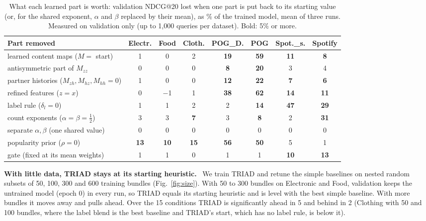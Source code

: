 \documentclass[runningheads]{llncs}
\renewcommand{\paragraph}[1]{\smallskip\noindent\textbf{#1}\ }
\begin{document}
\begin{table}[!htb]
\centering
\caption{What each learned part is worth: validation NDCG@20 lost when one part is put back to its starting value
(or, for the shared exponent, $\alpha$ and $\beta$ replaced by their mean), as \% of the trained model, mean of three
runs. Measured on validation only (up to 1,000 queries per dataset). Bold: 5\% or more.}
\label{tab:knock}
\setlength{\tabcolsep}{2.2pt}
\scriptsize
\begin{tabular}{lccccccc}
\toprule
Part removed & Electr. & Food & Cloth. & POG\_D. & POG & Spot.\_s. & Spotify\\
\midrule
learned content maps ($M=$ start) & 1 & 0 & 2 & \textbf{19} & \textbf{59} & \textbf{11} & \textbf{8}\\
\quad antisymmetric part of $M_{zz}$ & 0 & 0 & 0 & \textbf{8} & \textbf{20} & 3 & 4\\
\quad partner histories ($M_{zh},M_{hz},M_{hh}=0$) & 1 & 0 & 0 & \textbf{12} & \textbf{22} & \textbf{7} & \textbf{6}\\
refined features ($z=x$) & 0 & $-$1 & 1 & \textbf{38} & \textbf{62} & \textbf{14} & \textbf{11}\\
label rule ($\delta_l=0$) & 1 & 1 & 2 & 2 & \textbf{14} & \textbf{47} & \textbf{29}\\
count exponents ($\alpha=\beta=\tfrac12$) & 3 & 3 & \textbf{7} & 3 & \textbf{8} & 2 & \textbf{31}\\
separate $\alpha,\beta$ (one shared value) & 0 & 0 & 0 & 0 & 0 & 0 & 0\\
popularity prior ($\rho=0$) & \textbf{13} & \textbf{10} & \textbf{15} & \textbf{56} & \textbf{50} & 5 & 1\\
gate (fixed at its mean weights) & 1 & 1 & 0 & 1 & 1 & \textbf{10} & \textbf{13}\\
\bottomrule
\end{tabular}
\end{table}

\paragraph{With little data, TRIAD stays at its starting heuristic.} We train TRIAD and retune the simple baselines on
nested random subsets of 50, 100, 300 and 600 training bundles (Fig.~\ref{fig:size}). With 50 to 300 bundles on
Electronic and Food, validation keeps the untrained model (epoch 0) in every run, so TRIAD equals its starting
heuristic and is level with the best simple baseline. With more bundles it moves away and pulls ahead. Over the 15
conditions TRIAD is significantly ahead in 5 and behind in 2 (Clothing with 50 and 100 bundles, where the label blend
is the best baseline and TRIAD's start, which has no label rule, is below it).
\end{document}
